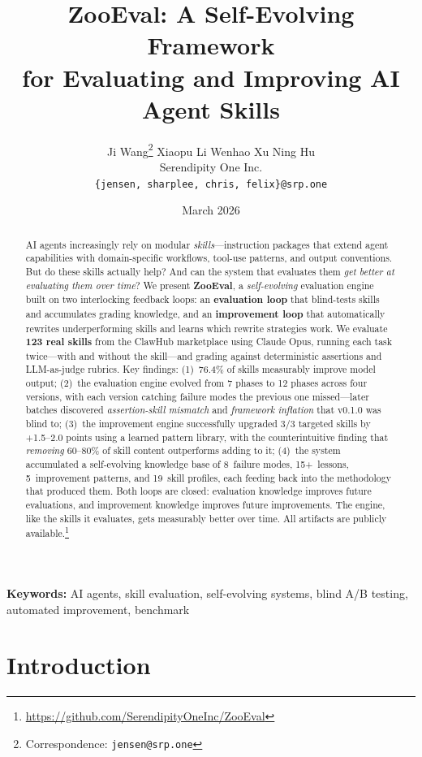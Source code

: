 \documentclass[11pt,a4paper]{article}
\title{%
\textbf{ZooEval: A Self-Evolving Framework\\for Evaluating and Improving AI Agent Skills}
}
\author{
Ji Wang\thanks{Correspondence: \texttt{jensen@srp.one}} \quad
Xiaopu Li \quad
Wenhao Xu \quad
Ning Hu \\[4pt]
Serendipity One Inc. \\
\texttt{\{jensen, sharplee, chris, felix\}@srp.one}
}
\date{March 2026}
\begin{document}
\maketitle

\begin{abstract}
AI agents increasingly rely on modular \emph{skills}---instruction packages that extend agent capabilities with domain-specific workflows, tool-use patterns, and output conventions.
But do these skills actually help? And can the system that evaluates them \emph{get better at evaluating them over time}?
We present \textbf{ZooEval}, a \emph{self-evolving} evaluation engine built on two interlocking feedback loops: an \textbf{evaluation loop} that blind-tests skills and accumulates grading knowledge, and an \textbf{improvement loop} that automatically rewrites underperforming skills and learns which rewrite strategies work.
We evaluate \textbf{123 real skills} from the ClawHub marketplace using Claude Opus, running each task twice---with and without the skill---and grading against deterministic assertions and LLM-as-judge rubrics.
Key findings: (1)~76.4\% of skills measurably improve model output; (2)~the evaluation engine evolved from 7 phases to 12 phases across four versions, with each version catching failure modes the previous one missed---later batches discovered \emph{assertion-skill mismatch} and \emph{framework inflation} that v0.1.0 was blind to; (3)~the improvement engine successfully upgraded 3/3 targeted skills by +1.5--2.0 points using a learned pattern library, with the counterintuitive finding that \emph{removing} 60--80\% of skill content outperforms adding to it; (4)~the system accumulated a self-evolving knowledge base of 8~failure modes, 15+~lessons, 5~improvement patterns, and 19~skill profiles, each feeding back into the methodology that produced them.
Both loops are closed: evaluation knowledge improves future evaluations, and improvement knowledge improves future improvements. The engine, like the skills it evaluates, gets measurably better over time.
All artifacts are publicly available.\footnote{\url{https://github.com/SerendipityOneInc/ZooEval}}
\end{abstract}

\noindent\textbf{Keywords:} AI agents, skill evaluation, self-evolving systems, blind A/B testing, automated improvement, benchmark

\section{Introduction}
\label{sec:intro}
\end{document}
